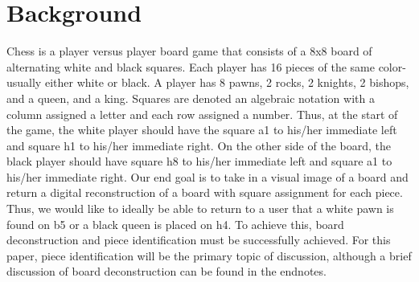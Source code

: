 \documentclass{article}
\begin{document}
\section{Background}
\label{sec:intro}
\hspace{\parindent}Chess is a player versus player board game that consists of a 8x8 board of alternating white and black squares. Each player has 16 pieces of the same color- usually either white or black. A player has 8 pawns, 2 rocks, 2 knights, 2 bishops, and a queen, and a king. Squares are denoted an algebraic notation with a column  assigned a letter and each row assigned a number. Thus, at the start of the game, the white player should have the square a1 to his/her immediate left and square h1 to his/her immediate right. On the other side of the board, the black player should have square h8 to his/her immediate left and square a1 to his/her immediate right. Our end goal is to take in a visual image of a board and return a digital reconstruction of a board with square assignment for each piece. Thus, we would like to ideally be able to return to a user that a white pawn is found on b5 or a black queen is placed on h4. To achieve this, board deconstruction and piece identification must be successfully achieved. For this paper, piece identification will be the primary topic of discussion, although a brief discussion of board deconstruction can be found in the endnotes.%
\end{document}
